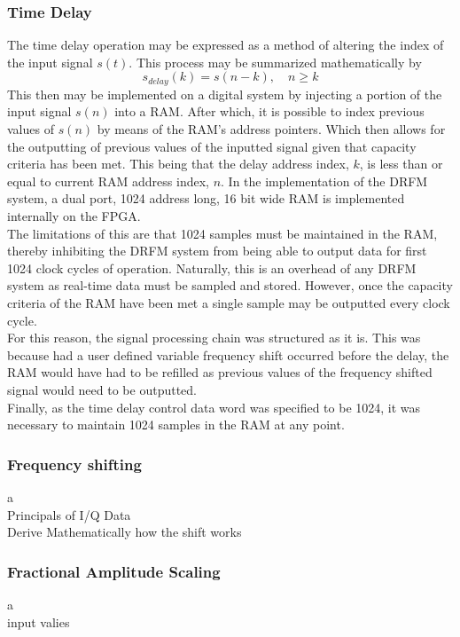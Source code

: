 	\subsubsection{Time Delay}
	 The time delay operation may be expressed as a method of altering the index of the input signal $s(t)$. This process may be summarized mathematically by
	\begin{equation}
		s_{delay}(k) = s(n -k),\quad n \geq k
	\end{equation}
	 \noindent This then may be implemented on a digital system by injecting a portion of the input signal $s(n)$ into a RAM. After which, it is possible to index previous values of $s(n)$ by means of the RAM's address pointers. Which then allows for the outputting of previous values of the inputted signal given that capacity criteria has been met. This being that the delay address index, $k$, is less than or equal to current RAM address index, $n$. In the implementation of the DRFM system, a dual port, 1024 address long, 16 bit wide RAM is implemented internally on the FPGA. \\ \newline The limitations of this are that 1024 samples must be maintained in the RAM, thereby inhibiting the DRFM system from being able to output data for first 1024 clock cycles of operation. Naturally, this is an overhead of any DRFM system as real-time data must be sampled and stored. However, once the capacity criteria of the RAM have been met a single sample may be outputted every clock cycle. \\ \newline For this reason, the signal processing chain was structured as it is. This was because had a user defined variable frequency shift occurred before the delay, the RAM would have had to be refilled as previous values of the frequency shifted signal would need to be outputted.  \\ \newline Finally, as the time delay control data word was specified to be 1024, it was necessary to maintain 1024 samples in the RAM at any point.\\
	\subsubsection{Frequency shifting}
		a \\ Principals of I/Q Data \\ Derive Mathematically how the shift works \\ 
	
	\subsubsection{Fractional Amplitude Scaling}
		a \\ input valies

	
	



